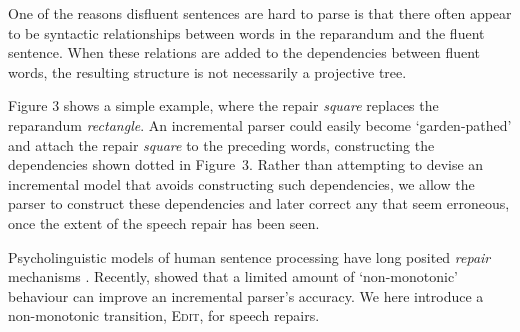 \documentclass[11pt,letterpaper]{article}
\begin{document}
One of the reasons disfluent sentences are hard to parse is that there often appear
to be syntactic relationships between words in the reparandum and the fluent sentence.
When these relations are added to the dependencies between fluent words,
the resulting structure is not necessarily a projective tree.


Figure 3 shows a simple example, where the repair {\em square} replaces the
reparandum {\em rectangle}.  An incremental parser could easily become
`garden-pathed' and attach the repair {\em square} to the preceding words,
constructing the dependencies shown dotted in Figure~3.  Rather than attempting
to devise an incremental model that avoids constructing such dependencies, we
allow the parser to construct these dependencies and later correct any that seem
erroneous, once the extent of the speech repair has been seen.

Psycholinguistic models of human sentence processing have long posited
\emph{repair} mechanisms \citep{FrazierRayner1982}.  Recently, \citet{honnibal:13}
showed that a limited amount of `non-monotonic' behaviour can 
improve an incremental parser's accuracy.
We here introduce a non-monotonic transition, \textsc{Edit}, for speech
repairs. 
\end{document}

